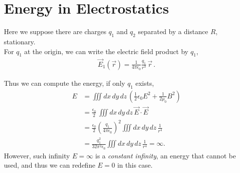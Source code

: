 \documentclass[11pt, onesided]{book}
\theoremstyle{break}
\theoremstyle{break}
\begin{document}
\section[Energy in Electrostatics]{\color{red}Energy in Electrostatics\color{black}}
Here we suppose there are charges $q_1$ and $q_2$ separated by a distance $R$, stationary.\\

For $q_1$ at the origin, we can write the electric field product by $q_1$,
\begin{align*}
\vec{E}_1(\vec{r}) = \frac{1}{4\pi \epsilon_0} \frac{q_1}{r^3}\,\vec{r}\,.
\end{align*}

Thus we can compute the energy, if only $q_1$ exists, 
\begin{align*}
E&= \iiint dx\,dy\,dz\,\left( \frac{1}{2}\epsilon_0 E^2 + \frac{1}{2\mu_0}B^2\right) \tag{4.11}\\
&= \frac{\epsilon_0}{2} \, \iiint dx\,dy\,dz \, \vec{E}\cdot \vec{E}\\
&= \frac{\epsilon_0}{2} \left( \frac{q_1}{4\pi \epsilon_0}\right)^2 \iiint dx\,dy\,dz\, \frac{1}{r^4}\\
&= \frac{q_1^2}{32\pi^2 \epsilon_0}  \iiint dx\,dy\,dz\, \frac{1}{r^4} = \infty.
\end{align*}
\setcounter{equation}{11}
However, such infinity $E = \infty$ is a \textit{constant infinity}, an energy that cannot be used, and thus we can redefine $E = 0$ in this case. \\
\end{document}
